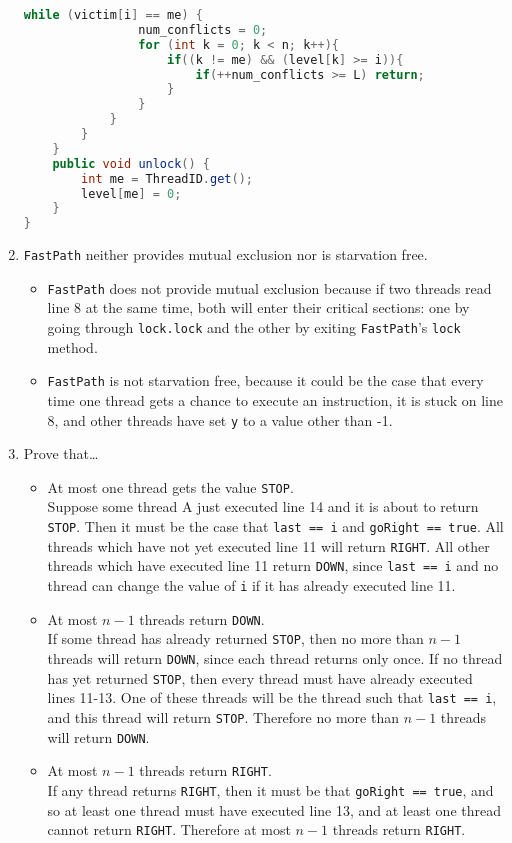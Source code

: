 \documentclass{article}
\begin{document}
\begin{enumerate}
\begin{lstlisting}[language=Java]
			while (victim[i] == me) {
				num_conflicts = 0;
				for (int k = 0; k < n; k++){
					if((k != me) && (level[k] >= i)){
						if(++num_conflicts >= L) return;
					}
				}
			}
		}
	}
	public void unlock() {
		int me = ThreadID.get();
		level[me] = 0;
	}
}
\end{lstlisting}

\item \texttt{FastPath} neither provides mutual exclusion nor is
  starvation free. 
\begin{itemize}
\item \texttt{FastPath} does not provide mutual exclusion because if
  two threads read line 8 at the same time, both will enter their
  critical sections: one by going through \texttt{lock.lock} and the
  other by exiting \texttt{FastPath}'s \texttt{lock} method.
\item \texttt{FastPath} is not starvation free, because it could be
  the case that every time one thread gets a chance to execute an
  instruction, it is stuck on line 8, and other threads have set
  \texttt{y} to a value other than -1. 
\end{itemize}

\item Prove that\dots
\begin{itemize}
\item At most one thread gets the value \texttt{STOP}.\\
Suppose some thread A just executed line 14 and it is about to return
\texttt{STOP}. Then it must be the case that \texttt{last == i} and
\texttt{goRight == true}. All threads which have not yet executed line
11 will return \texttt{RIGHT}. All other threads which have executed
line 11 return \texttt{DOWN}, since \texttt{last == i} and no thread
can change the value of \texttt{i} if it has already executed line 11.
\item At most $n -1$ threads return \texttt{DOWN}.\\
If some thread has already returned \texttt{STOP}, then no more than
$n-1$ threads will return \texttt{DOWN}, since each thread returns
only once. If no thread has yet returned \texttt{STOP}, then every
thread must have already executed lines 11-13. One of these threads
will be the thread such that \texttt{last == i}, and this thread will
return \texttt{STOP}. Therefore no more than $n-1$ threads will return
\texttt{DOWN}.
\item At most $n -1$ threads return \texttt{RIGHT}. \\
If any thread returns \texttt{RIGHT}, then it must be that
\texttt{goRight == true}, and so at least one thread must have
executed line 13, and at least one thread cannot return
\texttt{RIGHT}. Therefore at most $n-1$ threads return \texttt{RIGHT}.
\end{itemize}
\end{enumerate}
\end{document}
